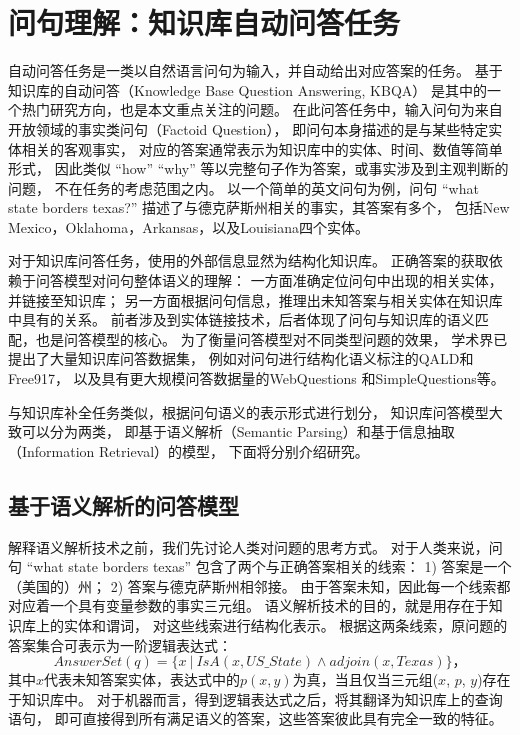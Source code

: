 
\section{问句理解：知识库自动问答任务}
\label{sec:rw-qa}


自动问答任务是一类以自然语言问句为输入，并自动给出对应答案的任务。
基于知识库的自动问答（Knowledge Base Question Answering, KBQA）
是其中的一个热门研究方向，也是本文重点关注的问题。
在此问答任务中，输入问句为来自开放领域的事实类问句（Factoid Question），
即问句本身描述的是与某些特定实体相关的客观事实，
对应的答案通常表示为知识库中的实体、时间、数值等简单形式，
因此类似 ``how'' ``why'' 等以完整句子作为答案，或事实涉及到主观判断的问题，
不在任务的考虑范围之内。
以一个简单的英文问句为例，问句 ``what state borders texas?''
描述了与德克萨斯州相关的事实，其答案有多个，
包括New Mexico，Oklahoma，Arkansas，以及Louisiana四个实体。

对于知识库问答任务，使用的外部信息显然为结构化知识库。
正确答案的获取依赖于问答模型对问句整体语义的理解：
一方面准确定位问句中出现的相关实体，并链接至知识库；
另一方面根据问句信息，推理出未知答案与相关实体在知识库中具有的关系。
前者涉及到实体链接技术，后者体现了问句与知识库的语义匹配，也是问答模型的核心。
为了衡量问答模型对不同类型问题的效果，
学术界已提出了大量知识库问答数据集，
例如对问句进行结构化语义标注的QALD\cite{cimiano2013multilingual}和Free917\cite{cai2013large}，
以及具有更大规模问答数据量的WebQuestions\cite{berant2013semantic}
和SimpleQuestions\cite{bordes2015large}等。


与知识库补全任务类似，根据问句语义的表示形式进行划分，
知识库问答模型大致可以分为两类，
即基于语义解析（Semantic Parsing）和基于信息抽取（Information Retrieval）的模型，
下面将分别介绍研究。


\subsection{基于语义解析的问答模型}

解释语义解析技术之前，我们先讨论人类对问题的思考方式。
对于人类来说，问句 ``what state borders texas'' 包含了两个与正确答案相关的线索：
1) 答案是一个（美国的）州；
2) 答案与德克萨斯州相邻接。
由于答案未知，因此每一个线索都对应着一个具有变量参数的事实三元组。
语义解析技术的目的，就是用存在于知识库上的实体和谓词，
对这些线索进行结构化表示。
根据这两条线索，原问题的答案集合可表示为一阶逻辑表达式：
\begin{equation}
\label{eqn:logic-form}
AnswerSet(q) = \{x~ |~ IsA(x, US\_State) \land adjoin(x, Texas)\}，
\end{equation}
其中$x$代表未知答案实体，表达式中的$p(x, y)$为真，当且仅当三元组($x$, $p$, $y$)存在于知识库中。
对于机器而言，得到逻辑表达式之后，将其翻译为知识库上的查询语句，
即可直接得到所有满足语义的答案，这些答案彼此具有完全一致的特征。

